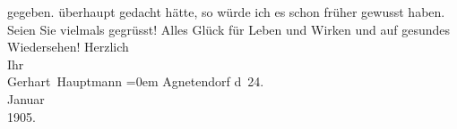 \begin{ledgroupsized}[t]{13cm}
{{{                        gegeben.}}}\label{K_L01494_1h} überhaupt gedacht hätte, so würde ich es schon früher
                    gewusst haben. Seien Sie vielmals gegrüsst! Alles Glück für Leben und Wirken und
                    auf gesundes Wiedersehen!\pend
           \pstart
           Herzlich{\\[\baselineskip]} Ihr{\\[\baselineskip]}\spacefill\mbox{Gerhart Hauptmann}\pend
           \leftskip=0em{}\pstart
           \noindent{}{\pb}Agnetendorf\pend
           \pstart
           d 24.{\\}Januar{\\}1905.\pend
           \endnumbering{}\end{ledgroupsized}  \newcommand{\dateiname}{L01494}\newcommand{\titel}{Gerhart Hauptmann an Arthur Schnitzler, 24. 1. 1905}\newcommand{\editorInnen}{Martin Anton Müller und Gerd-Hermann Susen}
      